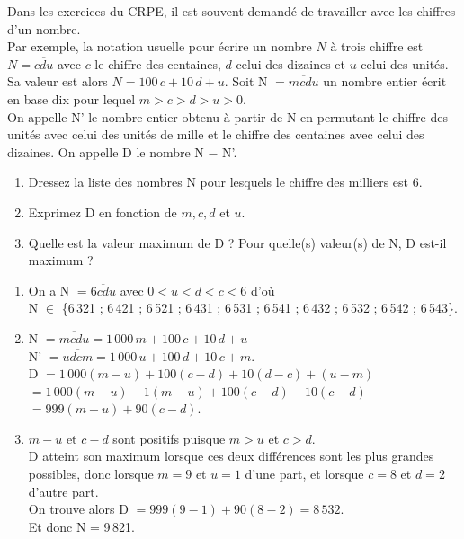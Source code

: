\begin{methode}
Dans les exercices du {\small CRPE}, il est souvent demandé de travailler avec les chiffres d'un nombre. \\
Par exemple, la notation usuelle pour écrire un nombre $N$ à trois chiffre est $N =\overline{cdu}$ avec $c$ le chiffre des centaines, $d$ celui des dizaines et $u$ celui des unités. \\
Sa valeur est alors $N =100\,c+10\,d+u$.
   \exercice
   Soit N $=\overline{mcdu}$ un nombre entier écrit en base dix pour lequel $m>c>d>u>0$. \\
   On appelle N' le nombre entier obtenu à partir de N en permutant le chiffre des unités avec celui des unités de mille et le chiffre des centaines avec celui des dizaines. On appelle D le nombre N $-$ N'.
   \begin{enumerate}
      \item Dressez la liste des nombres N pour lesquels le chiffre des milliers est 6.
      \item Exprimez D en fonction de $m, c, d$ et $u$.
      \item Quelle est la valeur maximum de D ? Pour quelle(s) valeur(s) de N, D est-il maximum ?
   \end{enumerate}
   
   \correction
   \begin{enumerate}
      \item On a N $=\overline{6cdu}$ avec $0<u<d<c<6$ d'où \\
      N $\in$ \{6\,321 ; 6\,421 ; 6\,521 ; 6\,431 ; 6\,531 ; 6\,541 ; 6\,432 ; 6\,532 ; 6\,542 ; 6\,543\}.
      \item N $=\overline{mcdu} =1\,000\,m+100\,c+10\,d+u$ \\
      N' $=\overline{udcm} =1\,000\,u+100\,d+10\,c+m$. \\
      D $=1\,000(m-u)+100(c-d)+10(d-c)+(u-m)$ \\
      \phantom{D} $=1\,000(m-u)-1(m-u)+100(c-d)-10(c-d)$ \\
      \phantom{D} $=999(m-u)+90(c-d)$.
      \item $m-u$ et $c-d$ sont positifs puisque $m>u$ et $c>d$. \\
      D atteint son maximum lorsque ces deux différences sont les plus grandes possibles, donc lorsque $m=9$ et $u=1$ d'une part, et lorsque $c=8$ et $d=2$ d'autre part. \\ [2pt]
      On trouve alors D $=999(9-1)+90(8-2) =8\,532$. \\
      Et donc N = 9\,821.
   \end{enumerate}
\end{methode}

